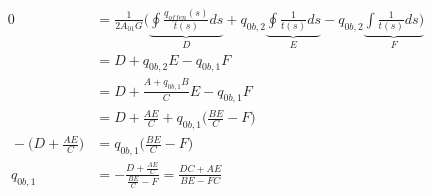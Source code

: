 \begin{itemize}
\begin{equation}
	\end{equation}\\
	\begin{equation}
		\begin{split}
			0 &= \frac{1}{2A_{01}G}(\underbrace{\oint\frac{q_{offen}(s)}{t(s)}ds}_D+q_{0b,2}\underbrace{\oint\frac{1}{t(s)}ds}_E-q_{0b,2}\underbrace{\int\frac{1}{t(s)}ds)}_F\\\
			&=D+q_{0b,2}E-q_{0b,1}F\\\
			&=D+\frac{A+q_{0b,1}B}{C}E-q_{0b,1}F\\\
			&=D+\frac{AE}{C}+q_{0b,1}\bigg(\frac{BE}{C}-F\bigg)\\\
			-\bigg(D+\frac{AE}{C}\bigg)&=q_{0b,1}\bigg(\frac{BE}{C}-F\bigg)\\\
			q_{0b,1}&=-\frac{D+\frac{AE}{C}}{\frac{BE}{C}-F}=\frac{DC+AE}{BE-FC}
		\end{split}
	\end{equation}\\
\end{itemize}
\newpage
